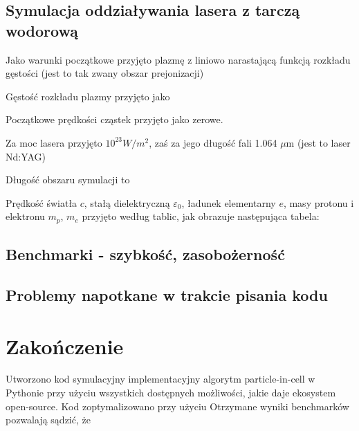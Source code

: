\subsection{Symulacja oddziaływania lasera z tarczą wodorową}

Jako warunki początkowe przyjęto plazmę z liniowo narastającą funkcją rozkładu gęstości (jest to tak zwany obszar prejonizacji) %

Gęstość rozkładu plazmy przyjęto jako

Początkowe prędkości cząstek przyjęto jako zerowe. %

Za moc lasera przyjęto $10^{23} W/m^2$, %
zaś za jego długość fali 1.064 $\mu$m (jest to laser Nd:YAG)

Długość obszaru symulacji to %

Prędkość światła $c$, stałą dielektryczną $\varepsilon_0$, ładunek elementarny $e$, masy protonu i elektronu $m_p$, $m_e$ przyjęto według tablic,
jak obrazuje następująca tabela:


\subsection{Benchmarki - szybkość, zasobożerność} %
\subsection{Problemy napotkane w trakcie pisania kodu}

\section[Zakończenie]{Zakończenie} %
Utworzono kod symulacyjny implementacyjny algorytm particle-in-cell w Pythonie przy użyciu wszystkich dostępnych
możliwości, jakie daje ekosystem open-source. Kod zoptymalizowano przy użyciu %
Otrzymane wyniki benchmarków pozwalają sądzić, że %
